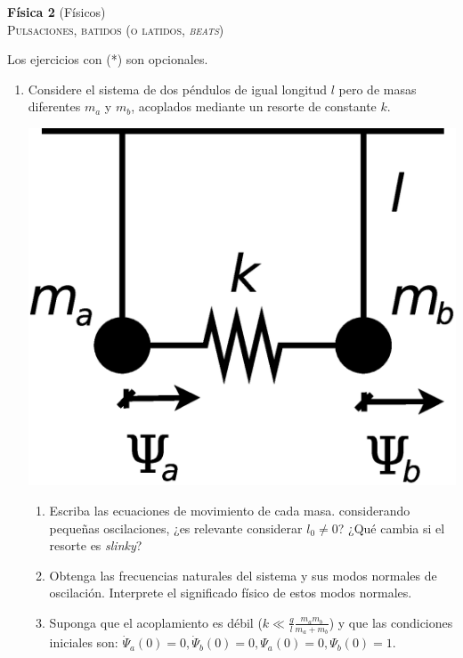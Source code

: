 \documentclass[11pt,spanish,a4paper]{article}
\begin{document}
\begin{center}
\textbf{Física 2} (Físicos) \hfill {}\\
	\textsc{\LARGE Pulsaciones, batidos (o latidos, \emph{beats})}
\end{center}

Los ejercicios con (*) son opcionales.

\begin{enumerate}


\item \label{pendacop}
\begin{minipage}[t][2.2cm]{0.75\textwidth}
Considere el sistema de dos péndulos de igual longitud $l$ pero de masas diferentes $m_{a}$ y $m_{b}$, acoplados mediante un resorte
de constante $k$.
\end{minipage}
\begin{minipage}[c][2cm][t]{0.2\textwidth}
  \includegraphics[width=\textwidth]{ej1-7}
\end{minipage}
\begin{enumerate}
	\item Escriba las ecuaciones de movimiento de cada masa. considerando pequeñas oscilaciones, ¿es relevante considerar $l_0\neq0$? ¿Qué cambia si el resorte es \emph{slinky}?   
	\item Obtenga las frecuencias naturales del sistema y sus modos normales de oscilación.
Interprete el significado físico de estos modos normales. 
	\item Suponga que el acoplamiento es débil ($k\ll\frac{g}{l}\frac{m_{a}m_{b}}{m_{a}+m_{b}}$) y que las condiciones iniciales son: $\dot{\Psi}_{a}(0)=0,\dot{\Psi}_{b}(0)=0,\Psi_{a}(0)=0,\Psi_{b}(0)=1$.

\end{enumerate}
\end{enumerate}
\end{document}
